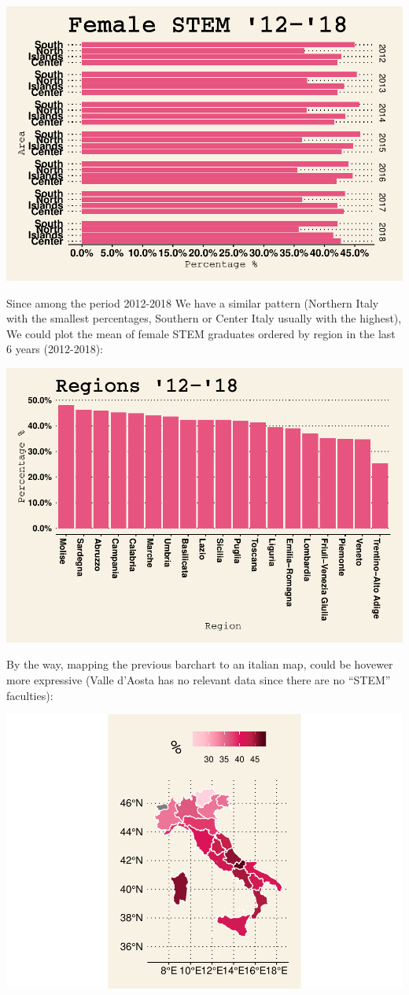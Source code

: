 \documentclass[
]{article}
\begin{document}
\includegraphics{g_gap_stem_files/figure-latex/unnamed-chunk-8-1.pdf}

Since among the period 2012-2018 We have a similar pattern (Northern
Italy with the smallest percentages, Southern or Center Italy usually
with the highest), We could plot the mean of female STEM graduates
ordered by region in the last 6 years (2012-2018):

\includegraphics{g_gap_stem_files/figure-latex/unnamed-chunk-9-1.pdf}

By the way, mapping the previous barchart to an italian map, could be
hovewer more expressive (Valle d'Aosta has no relevant data since there
are no ``STEM'' faculties):

\includegraphics{g_gap_stem_files/figure-latex/unnamed-chunk-10-1.pdf}
\end{document}
